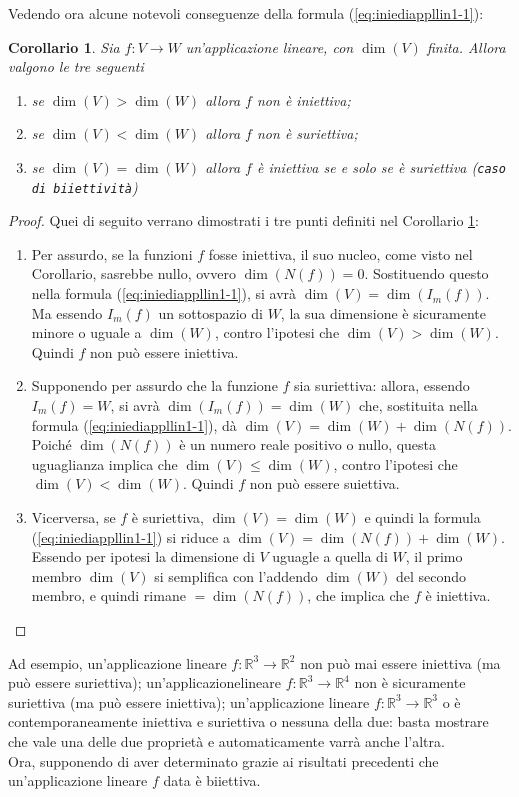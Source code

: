 \documentclass{book}
\theoremstyle{definition}
\theoremstyle{plain}
\newtheorem{corol}[section]{Corollario}
\begin{document}
Vedendo ora alcune notevoli conseguenze della formula (\ref{eq:iniediappllin1-1}):
\begin{corol}
  \label{corol:iniediappllin2}
  Sia $f:V\to W$ un'applicazione lineare, con $\dim (V)$ finita.
  Allora valgono le tre seguenti
  \begin{enumerate}[label=(\roman*)]
  \item se $\dim(V)>\dim(W)$ allora $f$ non è iniettiva;
  \item se $\dim(V)<\dim(W)$ allora $f$ non è suriettiva;
  \item se $\dim(V)=\dim(W)$ allora $f$ è iniettiva se e solo se è suriettiva (\texttt{caso di
      biiettività})
  \end{enumerate}
\end{corol}
\begin{proof}
  Quei di seguito verrano dimostrati i tre punti definiti nel Corollario \ref{corol:iniediappllin2}:
  \begin{enumerate}[label=(\roman*)]
  \item Per assurdo, se la funzioni $f$ fosse iniettiva, il suo nucleo, come visto nel Corollario,
    sasrebbe nullo, ovvero $\dim(N(f))=0$. Sostituendo questo nella formula (\ref{eq:iniediappllin1-1}),
    si avrà $\dim(V)=\dim(I_m(f))$. Ma essendo $I_m(f)$ un sottospazio di $W$, la sua dimensione è
    sicuramente minore o uguale a $\dim(W)$, contro l'ipotesi che $\dim(V)>\dim(W)$. Quindi $f$ non può
    essere iniettiva.
  \item Supponendo per assurdo che la funzione $f$ sia suriettiva: allora, essendo $I_m(f)=W$, si avrà
    $\dim(I_m(f))=\dim(W)$ che, sostituita nella formula (\ref{eq:iniediappllin1-1}), dà $\dim (V)=
    \dim(W)+\dim(N(f))$. Poiché $\dim(N(f))$ è un numero reale positivo o nullo, questa uguaglianza
    implica che $\dim(V)\leq \dim(W)$, contro l'ipotesi che $\dim(V)<\dim(W)$. Quindi $f$ non può essere
    suiettiva.
  \item Vicerversa, se $f$ è suriettiva, $\dim(V)=\dim(W)$ e quindi la formula
    (\ref{eq:iniediappllin1-1}) si riduce a $\dim(V)=\dim(N(f))+\dim(W)$. Essendo per ipotesi la
    dimensione di $V$ uguagle a quella di $W$, il primo membro $\dim(V)$ si semplifica con l'addendo
    $\dim(W)$ del secondo membro, e quindi rimane $=\dim(N(f))$, che implica che $f$ è iniettiva.
  \end{enumerate}
\end{proof}
Ad esempio, un'applicazione lineare $f:\mathds{R}^3\to\mathds{R}^2$ non può mai essere iniettiva
(ma può essere suriettiva); un'applicazionelineare $f:\mathds{R}^3\to\mathds{R}^4$ non è sicuramente
suriettiva (ma può essere iniettiva); un'applicazione lineare $f:\mathds{R}^3\to\mathds{R}^3$ o è
contemporaneamente iniettiva e suriettiva o nessuna della due: basta mostrare che vale una delle due
proprietà e automaticamente varrà anche l'altra.\\
Ora, supponendo di aver determinato grazie ai risultati precedenti che un'applicazione lineare
$f$ data è biiettiva.
\end{document}
